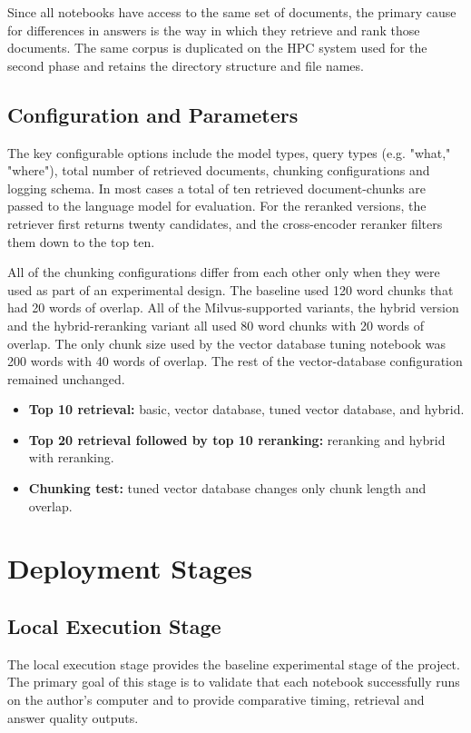 Since all notebooks have access to the same set of documents, the primary cause for differences in answers is the way in which they retrieve and rank those documents. The same corpus is duplicated on the \ac{HPC} system used for the second phase and retains the directory structure and file names.

\subsection{Configuration and Parameters}

The key configurable options include the model types, query types (e.g. "what," "where"), total number of retrieved documents, chunking configurations and logging schema. In most cases a total of ten retrieved document-chunks are passed to the language model for evaluation. For the reranked versions, the retriever first returns twenty candidates, and the cross-encoder reranker filters them down to the top ten.

All of the chunking configurations differ from each other only when they were used as part of an experimental design. The baseline used 120 word chunks that had 20 words of overlap. All of the Milvus-supported variants, the hybrid version and the hybrid-reranking variant all used 80 word chunks with 20 words of overlap. The only chunk size used by the vector database tuning notebook was 200 words with 40 words of overlap. The rest of the vector-database configuration remained unchanged.

\begin{itemize}
    \item \textbf{Top 10 retrieval:} basic, vector database, tuned vector database, and hybrid.
    \item \textbf{Top 20 retrieval followed by top 10 reranking:} reranking and hybrid with reranking.
    \item \textbf{Chunking test:} tuned vector database changes only chunk length and overlap.
\end{itemize}

\section{Deployment Stages}

\subsection{Local Execution Stage}
The local execution stage provides the baseline experimental stage of the project. The primary goal of this stage is to validate that each notebook successfully runs on the author’s computer and to provide comparative timing, retrieval and answer quality outputs.

